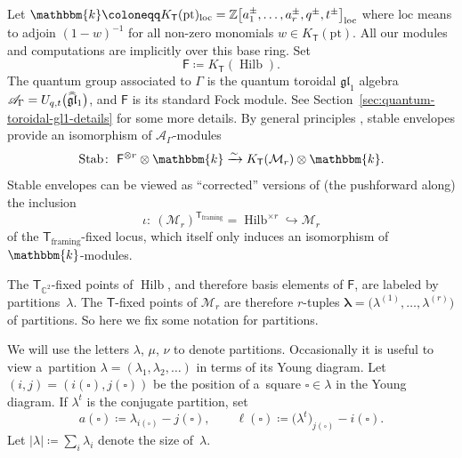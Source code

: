\documentclass[pdftex]{sigma}%
\numberwithin{equation}{section}
\renewcommand{\hat}[1]{\widehat{#1}}
\newcommand{\hhat}[1]{\hat{\vphantom{\rule{1pt}{5.5pt}}\smash{\hat{#1}}}}
\renewcommand{\vec}[1]{\bm{#1}}
\newcommand{\lie}[1]{\mathfrak{#1}}
\newcommand{\bC}{\mathbb{C}}
\newcommand{\bZ}{\mathbb{Z}}
\newcommand{\bk}{\mathbbm{k}}
\newcommand{\cM}{\mathcal{M}}
\newcommand{\sF}{\mathsf{F}}
\newcommand{\sT}{\mathsf{T}}
\newcommand{\scA}{\mathscr{A}}
\newcommand{\pt}{\mathrm{pt}}
\newcommand{\loc}{\mathrm{loc}}
\DeclareMathOperator{\Hilb}{Hilb}
\DeclareMathOperator{\Stab}{Stab}
\begin{document}
\begin{MyParagraph}
Let
$\bk \coloneqq K_{\sT}(\pt)_{\loc} = \bZ\big[a_1^\pm, \ldots, a_r^\pm, q^\pm, t^\pm\big]_{\loc}$
where $\loc$ means to adjoin $(1-w)^{-1}$ for all non-zero monomials
$w \in K_{\sT}(\pt)$. All our modules and computations are implicitly
over this base ring. Set
\[ \sF \coloneqq K_\sT(\Hilb). \]
The quantum group associated to $\Gamma$ is the quantum toroidal
$\lie{gl}_1$ algebra $\scA_\Gamma = U_{q,t}\big(\hhat{\lie{gl}}_1\big)$, and $\sF$
is its standard Fock module. See
Section~\ref{sec:quantum-toroidal-gl1-details} for some more details. By
general principles \cite{Maulik2019}, stable envelopes provide an
isomorphism of $\scA_\Gamma$-modules
\begin{equation} \label{eq:k-theory-instanton-moduli}
 \Stab\colon \ \sF^{\otimes r} \otimes \bk \xrightarrow{\sim} K_\sT(\cM_r) \otimes \bk.
\end{equation}
Stable envelopes can be viewed as ``corrected'' versions of (the
pushforward along) the inclusion
\[ \iota\colon \ (\cM_r)^{\sT_{\text{framing}}} = \Hilb^{\times r} \hookrightarrow \cM_r \]
of the $\sT_{\text{framing}}$-fixed locus, which itself only induces
an isomorphism of $\bk$-modules.
\end{MyParagraph}

\begin{MyParagraph}
The $\sT_{\bC^2}$-fixed points of $\Hilb$, and therefore basis
elements of $\sF$, are labeled by partitions~$\lambda$. The
$\sT$-fixed points of $\cM_r$ are therefore $r$-tuples $\vec\lambda =
\big(\lambda^{(1)}, \ldots, \lambda^{(r)}\big)$ of partitions. So here we fix
some notation for partitions.

We will use the letters $\lambda$, $\mu$, $\nu$ to denote
partitions. Occasionally it is useful to view a~partition
$\lambda = (\lambda_1, \lambda_2, \ldots)$ in terms of its Young
diagram. Let $(i, j) = (i(\square), j(\square))$ be the position of a~square $\square \in \lambda$ in the Young diagram. If $\lambda^t$ is
the conjugate partition, set
\[ a(\square) \coloneqq \lambda_{i(\square)} - j(\square), \qquad \ell(\square) \coloneqq \big(\lambda^t\big)_{j(\square)} - i(\square). \]
Let $|\lambda| \coloneqq \sum_i \lambda_i$ denote the size of~$\lambda$.
\end{MyParagraph}
\end{document}
